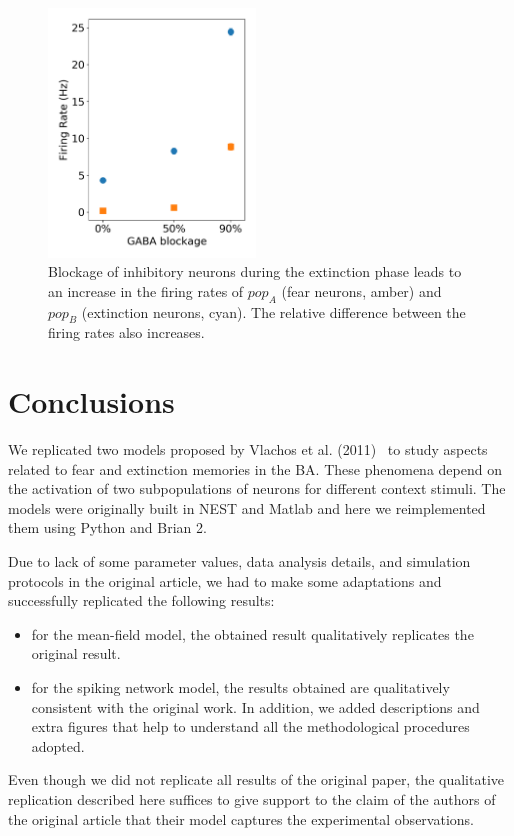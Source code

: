 \begin{figure}[!ht]
\centering
\includegraphics[width=5.5cm]{figures/gaba_block.png}
\caption{\label{fig:gabablock} Blockage of inhibitory neurons during the extinction phase leads to an increase in the firing rates of $pop_A$ (fear neurons, amber) and $pop_B$ (extinction neurons, cyan). The relative difference between the firing rates also increases.}
\end{figure}


\FloatBarrier


\section*{Conclusions}
We replicated two models proposed by Vlachos et al. (2011)~\cite{Vlachos2011} to study aspects related to fear and extinction memories in the BA. These phenomena depend on the activation of two subpopulations of neurons for different context stimuli. The models were originally built in NEST and Matlab and here we reimplemented them using Python and Brian 2.

Due to lack of some parameter values, data analysis details, and simulation protocols in the original article, we had to make some adaptations and successfully replicated the following results:
\begin{itemize}

\item for the mean-field model, the obtained result qualitatively replicates the original result. 
\item for the spiking network model, the results obtained are qualitatively consistent with the original work. In addition, we added descriptions and extra figures that help to understand all the methodological procedures adopted.
\end{itemize}

Even though we did not replicate all results of the original paper, the qualitative replication described here suffices to give support to the claim of the authors of the original article that their model captures the experimental observations.

